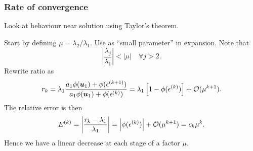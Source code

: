\documentclass{beamer}
\newcommand{\bfm}[1]{{\boldsymbol{#1}}}
\begin{document}
\begin{frame}
  \frametitle{Rate of convergence}

  Look at behaviour near solution using Taylor's theorem.

  \vspace{1ex}

  Start by defining $\mu = \lambda_2 / \lambda_1$.
  Use as ``small parameter'' in expansion. Note that
  \begin{equation*}
    \left| \frac{\lambda_j}{\lambda_1} \right|  < |\mu| \quad \forall
    j > 2.
  \end{equation*} \pause
  Rewrite ratio as
  \begin{equation*}
    r_k =  \lambda_1
    \frac{ a_1 \phi(\bfm{u}_1) + \phi(\epsilon^{(k+1)})}{ a_1
      \phi( \bfm{u}_1) + \phi(\epsilon^{(k)})} = \lambda_1 \left[
      1 - \phi (\epsilon^{(k)}) \right] + {\cal O} (\mu^{k+1}).
  \end{equation*} \pause
  The relative error is then
  \begin{equation*}
    E^{(k)} = \left| \frac{r_k - \lambda_1}{\lambda_1} \right|
    = \left| \phi( \epsilon^{(k)} ) \right|  + {\cal O}
    (\mu^{k+1})
    = c_k \mu^k.
  \end{equation*}
  Hence we have a linear decrease at each stage of a factor $\mu$.

\end{frame}
\end{document}
